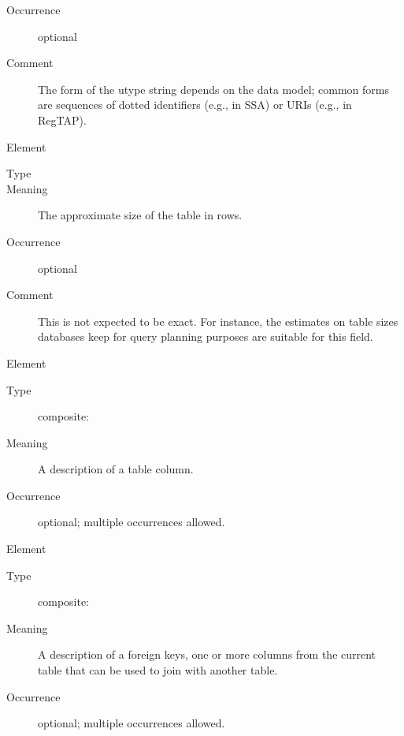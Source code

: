 \documentclass[11pt,a4paper]{ivoa}
\begin{document}
\begin{generated}
\begin{bigdescription}
\begin{description}
\item[Occurrence] optional
\item[Comment]
                  The form of the utype string depends on the data
                  model; common forms are sequences of dotted identifiers
                  (e.g., in SSA) or URIs (e.g., in RegTAP).


\end{description}
\item[Element \xmlel{nrows}]
\begin{description}
\item[Type] 
\item[Meaning]
                  The approximate size of the table in rows.

\item[Occurrence] optional
\item[Comment]
                  This is not expected to be exact.  For instance, the
                  estimates on table sizes databases keep for query
                  planning purposes are suitable for this field.


\end{description}
\item[Element \xmlel{column}]
\begin{description}
\item[Type] composite: 
\item[Meaning]
                  A description of a table column.

\item[Occurrence] optional; multiple occurrences allowed.

\end{description}
\item[Element \xmlel{foreignKey}]
\begin{description}
\item[Type] composite: 
\item[Meaning]
                  A description of a foreign keys, one or more columns
                  from the current table that can be used to join with
                  another table.

\item[Occurrence] optional; multiple occurrences allowed.

\end{description}


\end{bigdescription}\endgroup

\endgroup
\end{generated}
\end{document}
